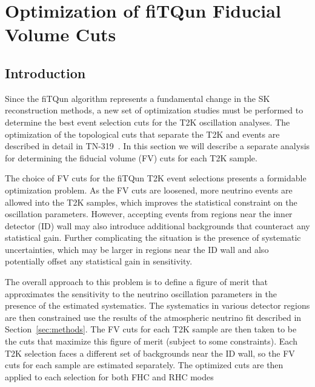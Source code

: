 
\section{Optimization of fiTQun Fiducial Volume Cuts}
\label{sec:fvopt}


\subsection{Introduction}
\label{subsec:fvintro}


Since the fiTQun algorithm represents a fundamental change in the SK
reconstruction methods, a new set of optimization studies must be performed to
determine the best event selection cuts for the T2K oscillation analyses.
The optimization of the topological cuts that separate the T2K \numu and \nue
events are described in detail in TN-319~\cite{tn319}. In this section
we will describe a separate analysis for determining the fiducial volume (FV) cuts for each
T2K sample.  

The choice of FV cuts for the fiTQun T2K event selections presents a formidable
optimization problem. As the FV cuts are loosened, more neutrino events are
allowed into the T2K samples, which improves the statistical constraint on the
oscillation parameters.  However, accepting events from regions near the inner
detector (ID) wall may also introduce additional backgrounds that counteract
any statistical gain.  Further complicating the situation is the presence of
systematic uncertainties, which may be larger in regions near the ID wall and
also potentially offset any statistical gain in sensitivity.

The overall approach to this problem is to define a figure of merit that
approximates the sensitivity to the neutrino oscillation parameters in the
presence of the estimated systematics. The systematics in various detector
regions are then constrained use the results of the atmospheric neutrino fit
described in Section~\ref{sec:methods}.  The FV cuts for each T2K sample are 
then taken to be the cuts that maximize this figure of merit (subject to some
constraints). Each T2K selection faces a different set of backgrounds near the ID
wall, so the FV cuts for each sample are estimated separately.  The optimized cuts
are then applied to each selection for both FHC and RHC modes


